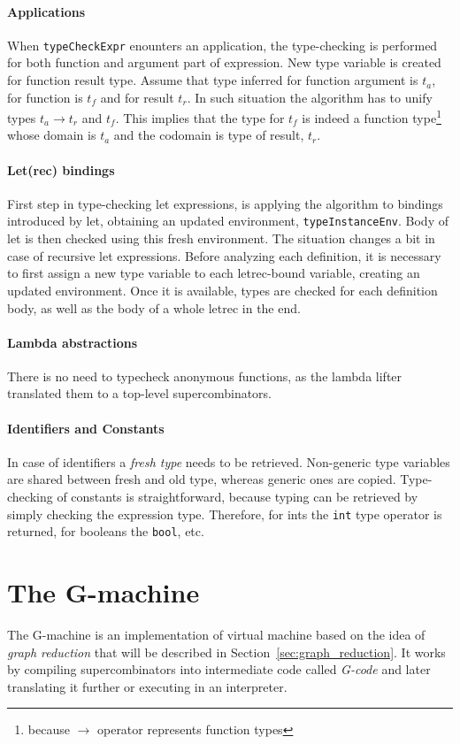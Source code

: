 \documentclass[12pt,a4paper]{report}
\begin{document}
\subsubsection{Applications}
When \texttt{typeCheckExpr} enounters an application, the type-checking is
performed for both function and argument part of expression. New type
variable is created for function result type. Assume that type inferred for
function argument is $t_a$, for function is $t_f$ and for result $t_r$. In such
situation the algorithm has to unify types $t_a \rightarrow t_r$ and $t_f$.
This implies that the type for $t_f$ is indeed a function type\footnote{because
$\rightarrow$ operator represents function types} whose domain is $t_a$ and the
codomain is type of result, $t_r$.

\subsubsection{Let(rec) bindings}
First step in type-checking let expressions, is applying the algorithm to
bindings introduced by let, obtaining an updated environment,
\texttt{typeInstanceEnv}. Body of let is then checked using this fresh
environment. The situation changes a bit in case of recursive let expressions.
Before analyzing each definition, it is necessary to first assign a new type
variable to each letrec-bound variable, creating an updated environment. Once
it is available, types are checked for each definition body, as well as the
body of a whole letrec in the end.

\subsubsection{Lambda abstractions}
There is no need to typecheck anonymous functions, as the lambda lifter
translated them to a top-level supercombinators.

\subsubsection{Identifiers and Constants}
In case of identifiers a \textit{fresh type} needs to be retrieved. Non-generic
type variables are shared between fresh and old type, whereas generic ones are
copied. Type-checking of constants is straightforward, because typing can be
retrieved by simply checking the expression type. Therefore, for ints the
\texttt{int} type operator is returned, for booleans the \texttt{bool}, etc.

\chapter{The G-machine}
The G-machine is an implementation of virtual machine based on the idea of
\textit{graph reduction} that will be described in
Section~\ref{sec:graph_reduction}. It works by compiling supercombinators into
intermediate code called \textit{G-code} and later translating it further or
executing in an interpreter.
\end{document}
